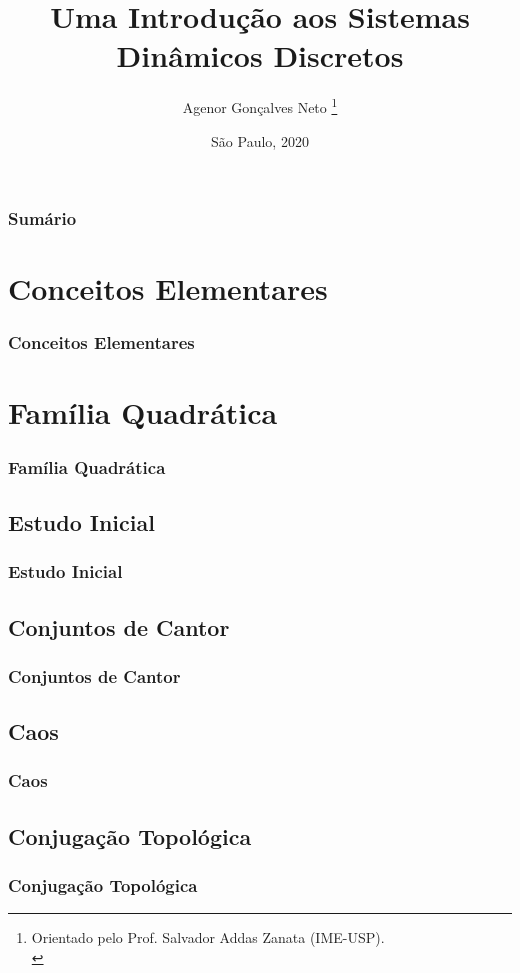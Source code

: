 \documentclass{beamer}
\title{Uma Introdução aos Sistemas Dinâmicos Discretos}\author{Agenor Gonçalves Neto \footnote{Orientado pelo Prof. Salvador Addas Zanata (IME-USP).\\}}
\date{São Paulo, 2020}
\begin{document}

\begin{frame}
\titlepage
\end{frame}

\begin{frame}[t]
\vspace{5pt}
\frametitle{Sumário}
\tableofcontents%
\end{frame}

\section{Conceitos Elementares}
\begin{frame}[t]
\frametitle{Conceitos Elementares}
\end{frame}

\section{Família Quadrática}
\begin{frame}[t]
\frametitle{Família Quadrática}
\end{frame}

\subsection{Estudo Inicial}
\begin{frame}[t]
\frametitle{Estudo Inicial}
\end{frame}

\subsection{Conjuntos de Cantor}
\begin{frame}[t]
\frametitle{Conjuntos de Cantor}    
\end{frame}   

\subsection{Caos}
\begin{frame}[t]
\frametitle{Caos}
\end{frame}

\subsection{Conjugação Topológica}
\begin{frame}[t]
\frametitle{Conjugação Topológica}
\end{frame}
\end{document}
